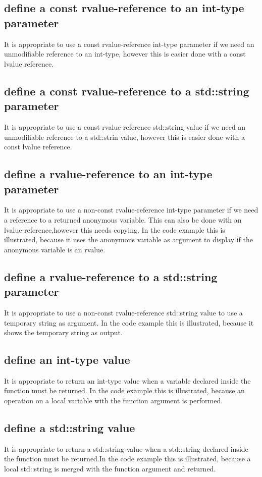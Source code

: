 \documentclass[a4paper]{article}
\begin{document}
\subsection*{define a const rvalue-reference to an int-type parameter}
It is appropriate to use a const rvalue-reference int-type parameter if we need an unmodifiable reference to an int-type, however this is easier done with a const lvalue reference.
\subsection*{define a const rvalue-reference to a std::string parameter}
It is appropriate to use a const rvalue-reference std::string value if we need an unmodifiable reference to a std::strin value, however this is easier done with a const lvalue reference.
\subsection*{define a rvalue-reference to an int-type parameter}
It is appropriate to use a non-const rvalue-reference int-type parameter if we need a reference to a returned anonymous variable. This can also be done with an lvalue-reference,however this needs copying. In the code example this is illustrated, because it uses the anonymous variable as argument to display if the anonymous variable is an rvalue.

\subsection*{define a rvalue-reference to a std::string parameter}
It is appropriate to use a non-const rvalue-reference std::string value to use a temporary string as argument. In the code example this is illustrated, because it shows the temporary string as output.

\subsection*{define an int-type value}
It is appropriate to return an int-type value when a variable declared inside the function must be returned. In the code example this is illustrated, because an operation on a local variable with the function argument is performed.

\subsection*{define a std::string value}
It is appropriate to return a std::string value when a std::string declared inside the function must be returned.In the code example this is illustrated, because a local std::string is merged with the function argument and returned.

\end{document}
